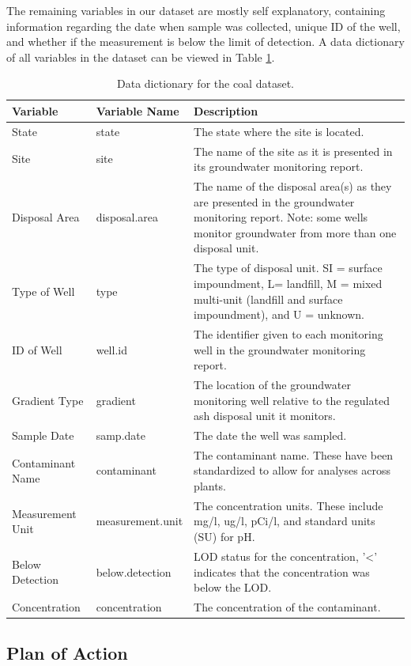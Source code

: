 \documentclass[12pt, twoside]{amherstthesis}
\begin{document}
The remaining variables in our dataset are mostly self explanatory, containing information regarding the date when sample was collected, unique ID of the well, and whether if the measurement is below the limit of detection. A data dictionary of all variables in the dataset can be viewed in Table \ref{tab:datadict}.
\begin{table}

\caption{\label{tab:datadict}Data dictionary for the coal dataset.}
\centering
\begin{tabular}[t]{ll>{\raggedright\arraybackslash}p{7.6cm}}
\toprule
Variable & Variable Name & Description\\
\midrule
State & state & The state where the site is located.\\
\addlinespace
Site & site & The name of the site as it is presented in its
             groundwater monitoring \vphantom{1} report.\\
\addlinespace
Disposal Area & disposal.area & The name of the disposal area(s) as they are presented 
             in the groundwater monitoring report. Note: some wells 
             monitor groundwater from more than one disposal unit.\\
\addlinespace
Type of Well & type & The type of disposal unit. SI = surface impoundment, 
             L= landfill, M = mixed multi-unit (landfill and surface 
             impoundment), and U = unknown.\\
\addlinespace
ID of Well & well.id & The identifier given to each monitoring well in the 
             groundwater monitoring report.\\
\addlinespace
Gradient Type & gradient & The location of the groundwater monitoring well 
             relative to the regulated ash disposal unit it 
             monitors.\\
\addlinespace
Sample Date & samp.date & The date the well was sampled.\\
\addlinespace
Contaminant Name & contaminant & The contaminant name. These have been standardized to 
             allow for analyses across plants.\\
\addlinespace
Measurement Unit & measurement.unit & The concentration units. These include mg/l, ug/l, 
             pCi/l, and standard units (SU) for pH.\\
\addlinespace
Below Detection & below.detection & LOD status for the concentration, '<' indicates that 
             the concentration was below the LOD.\\
\addlinespace
Concentration & concentration & The concentration of the contaminant.\\
\bottomrule
\end{tabular}
\end{table}
\hypertarget{plan-of-action}{%
\subsection{Plan of Action}\label{plan-of-action}}
\end{document}
